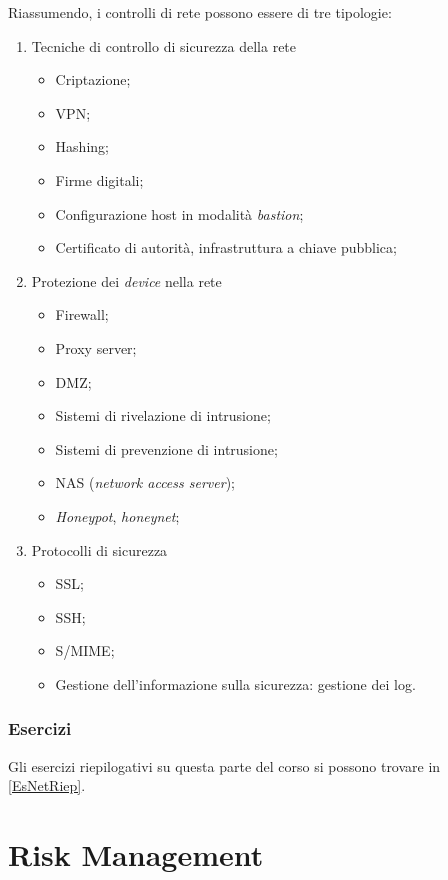 Riassumendo, i controlli di rete possono essere di tre tipologie:

\begin{enumerate}
 \item Tecniche di controllo di sicurezza della rete
 \begin{itemize}
  \item Criptazione;
  \item VPN;
  \item Hashing;
  \item Firme digitali;
  \item Configurazione host in modalità \textit{bastion};
  \item Certificato di autorità, infrastruttura a chiave pubblica;
 \end{itemize}

 \item Protezione dei \textit{device} nella rete
 \begin{itemize}
  \item Firewall;
  \item Proxy server;
  \item DMZ;
  \item Sistemi di rivelazione di intrusione;
  \item Sistemi di prevenzione di intrusione;
  \item NAS (\textit{network access server});
  \item \textit{Honeypot}, \textit{honeynet};
 \end{itemize}

 \item Protocolli di sicurezza
 \begin{itemize}
  \item SSL;
  \item SSH;
  \item S/MIME;
  \item Gestione dell'informazione sulla sicurezza: gestione dei log.
 \end{itemize}
\end{enumerate}



\section{Esercizi}

Gli esercizi riepilogativi su questa parte del corso si possono trovare in
\ref{EsNetRiep}.


\part{Risk Management}

